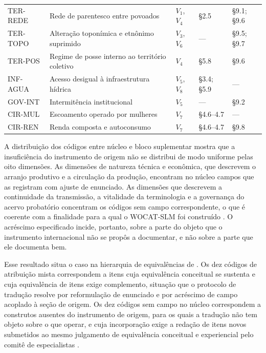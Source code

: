 \documentclass[preprint,authoryear,12pt]{elsarticle}
\newcommand{\fonte}[1]{%
  \par\vspace{2pt}\noindent{\footnotesize Fonte: #1}\par}
\begin{document}
\begin{table}[H]
\begin{tabular}{p{1.9cm}p{5.0cm}p{1.3cm}p{2.6cm}p{2.4cm}}
TER-REDE & Rede de parentesco entre povoados & $V_1$, $V_4$ & §2.5 & §9.1; §9.6 \\
TER-TOPO & Alteração toponímica e etnônimo suprimido & $V_3$, $V_6$ & --- & §9.5; §9.7 \\
TER-POS & Regime de posse interno ao território coletivo & $V_4$ & §5.8 & §9.6 \\
\addlinespace
INF-AGUA & Acesso desigual à infraestrutura hídrica & $V_5$, $V_8$ & §3.4; §5.9 & --- \\
GOV-INT & Intermitência institucional & $V_5$ & --- & §9.2 \\
\addlinespace
CIR-MUL & Escoamento operado por mulheres & $V_7$ & §4.6--4.7 & --- \\
CIR-REN & Renda composta e autoconsumo & $V_7$ & §4.6--4.7 & §9.8 \\
\bottomrule
\end{tabular}
\fonte{\textbf{Elaborado pelos autores} (2026).}
\end{table}

A distribuição dos códigos entre núcleo e bloco suplementar mostra que a insuficiência do instrumento de origem não se distribui de modo uniforme pelas oito dimensões. As dimensões de natureza técnica e econômica, que descrevem o arranjo produtivo e a circulação da produção, encontram no núcleo campos que as registram com ajuste de enunciado. As dimensões que descrevem a continuidade da transmissão, a vitalidade da terminologia e a governança do acervo probatório concentram os códigos sem campo correspondente, o que é coerente com a finalidade para a qual o WOCAT-SLM foi construído \citep{Liniger2019,Schwilch2011}. O acréscimo especificado incide, portanto, sobre a parte do objeto que o instrumento internacional não se propôs a documentar, e não sobre a parte que ele documenta bem.

Esse resultado situa o caso na hierarquia de equivalências de \citet{Herdman1999}. Os dez códigos de atribuição mista correspondem a itens cuja equivalência conceitual se sustenta e cuja equivalência de itens exige complemento, situação que o protocolo de tradução resolve por reformulação de enunciado e por acréscimo de campo acoplado à seção de origem. Os dez códigos sem campo no núcleo correspondem a construtos ausentes do instrumento de origem, para os quais a tradução não tem objeto sobre o que operar, e cuja incorporação exige a redação de itens novos submetidos ao mesmo julgamento de equivalência conceitual e experiencial pelo comitê de especialistas \citep{Beaton2000}.
\end{document}
